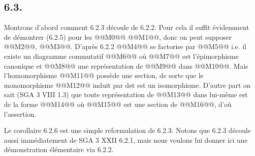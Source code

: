 
\subsection*{6.3.}
Montrons d'abord comment 6.2.3 découle de 6.2.2. Pour cela il suffit évidemment de démontrer (6.2.5) pour les
@@M0@@ @@M1@@, donc on peut supposer @@M2@@, @@M3@@. D'après 6.2.2 @@M4@@ se factorise par @@M5@@ i.e. il existe un diagramme commutatif
@@M6@@
où @@M7@@ est l'épimorphisme canonique et @@M8@@ une représentation de @@M9@@ dans @@M10@@. Mais l'homomorphisme
@@M11@@
possède une section, de sorte que le monomorphisme
@@M12@@
induit par det est un isomorphisme. D'autre part on sait (SGA 3 VIII 1.3) que toute représentation de @@M13@@ dans lui-même est de la forme
@@M14@@
où @@M15@@ est une section de @@M16@@, d'où l'assertion.

Le corollaire 6.2.6 est une simple reformulation de 6.2.3. Notons que 6.2.3 découle aussi immédiatement de SGA 3 XXII 6.2.1, mais nous voulons lui donner ici une démonstration élémentaire via 6.2.2.

